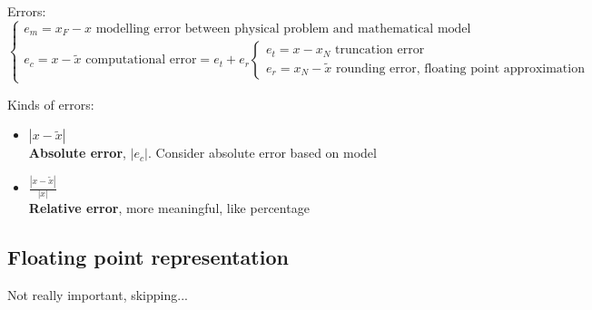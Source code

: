 Errors:
$$
\begin{cases}
    e_m=x_F-x\text{ modelling error between physical problem and mathematical model}\\
    e_c=x-\tilde{x}\text{ computational error}=e_t+e_r
    \begin{cases}    
        e_t=x-x_N\text{ truncation error}\\
        e_r=x_N-\tilde{x}\text{ rounding error, floating point approximation}
    \end{cases}
\end{cases}
$$

Kinds of errors:
\begin{itemize}
    \item $|x-\tilde{x}|$\\
    \textbf{Absolute error}, $|e_c|$. Consider absolute error based on model
    \item $\frac{|x-\tilde{x}|}{|x|}$\\
    \textbf{Relative error}, more meaningful, like percentage
\end{itemize}

\subsection{Floating point representation}
Not really important, skipping...